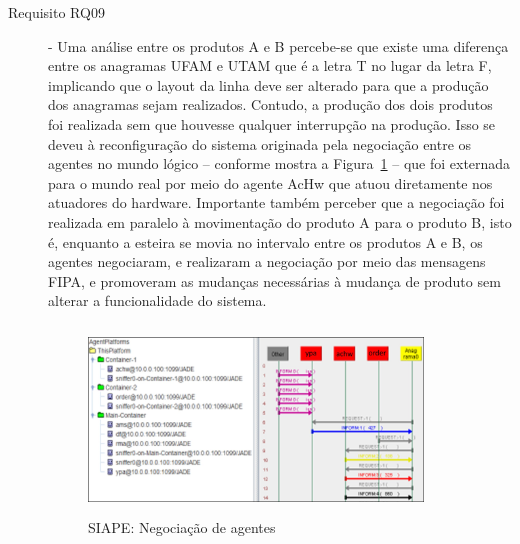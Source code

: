 \documentclass[10pt,letterpaper,twocolumn]{IEEEtran}
\begin{document}
\begin{description}
	\item[Requisito RQ09] - Uma análise entre os produtos A e B percebe-se que existe uma diferença entre os anagramas UFAM e UTAM que é a letra T no lugar da letra F, implicando que o layout da linha deve ser alterado para que a produção dos anagramas sejam realizados. Contudo, a produção dos dois produtos foi realizada sem que houvesse qualquer interrupção na produção. Isso se deveu à reconfiguração do sistema originada pela negociação entre os agentes no mundo lógico -- conforme mostra a Figura~\ref{F144} -- que foi externada para o mundo real por meio do agente AcHw que atuou diretamente nos atuadores do hardware. Importante também perceber que a negociação foi realizada em paralelo à movimentação do produto A para o produto B, isto é, enquanto a esteira se movia no intervalo entre os produtos A e B, os agentes negociaram, e realizaram a negociação por meio das mensagens FIPA, e promoveram as mudanças necessárias à mudança de produto sem alterar a funcionalidade do sistema.	
	
	\begin{figure}[h]
		\centering
		\includegraphics[width=8.9cm, height=5cm]{MeDSE_imagens/F144_ACL.jpg} 
		\caption{SIAPE: Negociação de agentes}
		\label{F144}
	\end{figure}	
	
	
	

\end{description}
\end{document}
